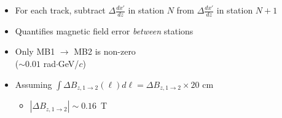 \documentclass[compress]{beamer}
\begin{document}
\begin{frame}
\begin{columns}
\begin{itemize}
\item For each track, subtract $\Delta \frac{dx'}{dz}$ in station $N$ from $\Delta \frac{dx'}{dz}$ in station $N+1$

\item Quantifies magnetic field error {\it between} stations

\item Only MB1 $\to$ MB2 is non-zero \\ ($\sim 0.01$ rad$\cdot$GeV/$c$)

\item Assuming $\displaystyle \int \Delta B_{z, 1\to 2}(\ell) d\ell = \Delta B_{z, 1\to 2} \times \mbox{20~cm}$
\begin{itemize}
\item $| \Delta B_{z, 1\to 2}| \sim 0.16$~T
\end{itemize}
\end{itemize}
\end{columns}
\end{frame}

\end{document}
